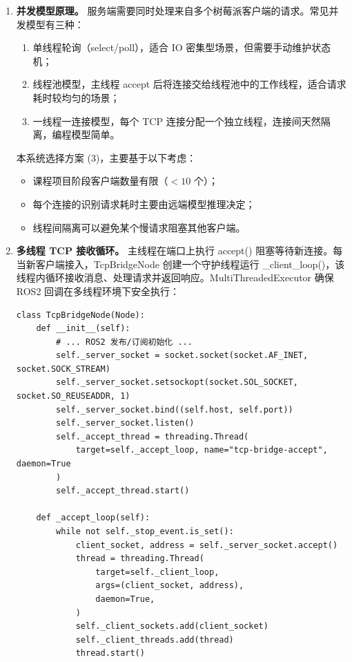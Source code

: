\documentclass[12pt]{article}
\newcommand{\code}[1]{{\ttfamily #1}}
\begin{document}
\begin{enumerate}
	\item \textbf{并发模型原理。} 服务端需要同时处理来自多个树莓派客户端的请求。常见并发模型有三种：

	      \begin{enumerate}
		      \item 单线程轮询（\code{select/poll}），适合 IO 密集型场景，但需要手动维护状态机；
		      \item 线程池模型，主线程 accept 后将连接交给线程池中的工作线程，适合请求耗时较均匀的场景；
		      \item 一线程一连接模型，每个 TCP 连接分配一个独立线程，连接间天然隔离，编程模型简单。
	      \end{enumerate}

	      本系统选择方案 (3)，主要基于以下考虑：

	      \begin{itemize}
		      \item 课程项目阶段客户端数量有限（$< 10$ 个）；
		      \item 每个连接的识别请求耗时主要由远端模型推理决定；
		      \item 线程间隔离可以避免某个慢请求阻塞其他客户端。
	      \end{itemize}

	\item \textbf{多线程 TCP 接收循环。} 主线程在端口上执行 \code{accept()} 阻塞等待新连接。每当新客户端接入，\code{TcpBridgeNode} 创建一个守护线程运行 \code{\_client\_loop()}，该线程内循环接收消息、处理请求并返回响应。\code{MultiThreadedExecutor} 确保 ROS2 回调在多线程环境下安全执行：

	      \begin{lstlisting}[caption={服务端多线程 TCP 接收模型},label={lst:tcp-server-model}]
class TcpBridgeNode(Node):
    def __init__(self):
        # ... ROS2 发布/订阅初始化 ...
        self._server_socket = socket.socket(socket.AF_INET, socket.SOCK_STREAM)
        self._server_socket.setsockopt(socket.SOL_SOCKET, socket.SO_REUSEADDR, 1)
        self._server_socket.bind((self.host, self.port))
        self._server_socket.listen()
        self._accept_thread = threading.Thread(
            target=self._accept_loop, name="tcp-bridge-accept", daemon=True
        )
        self._accept_thread.start()

    def _accept_loop(self):
        while not self._stop_event.is_set():
            client_socket, address = self._server_socket.accept()
            thread = threading.Thread(
                target=self._client_loop,
                args=(client_socket, address),
                daemon=True,
            )
            self._client_sockets.add(client_socket)
            self._client_threads.add(thread)
            thread.start()


\end{lstlisting}
\end{enumerate}
\end{document}
